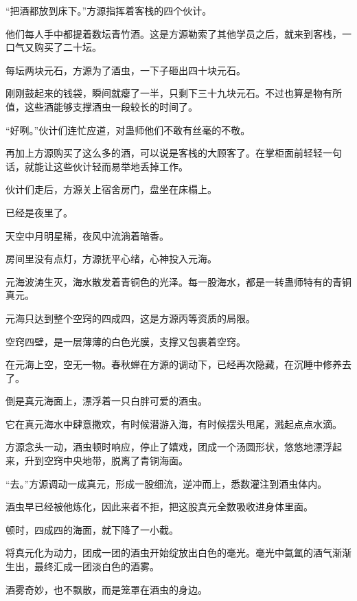 
\begin{this_body}



“把酒都放到床下。”方源指挥着客栈的四个伙计。

他们每人手中都提着数坛青竹酒。这是方源勒索了其他学员之后，就来到客栈，一口气又购买了二十坛。

每坛两块元石，方源为了酒虫，一下子砸出四十块元石。

刚刚鼓起来的钱袋，瞬间就瘪了一半，只剩下三十九块元石。不过也算是物有所值，这些酒能够支撑酒虫一段较长的时间了。

“好咧。”伙计们连忙应道，对蛊师他们不敢有丝毫的不敬。

再加上方源购买了这么多的酒，可以说是客栈的大顾客了。在掌柜面前轻轻一句话，就能让这些伙计轻而易举地丢掉工作。

伙计们走后，方源关上宿舍房门，盘坐在床榻上。

已经是夜里了。

天空中月明星稀，夜风中流淌着暗香。

房间里没有点灯，方源抚平心绪，心神投入元海。

元海波涛生灭，海水散发着青铜色的光泽。每一股海水，都是一转蛊师特有的青铜真元。

元海只达到整个空窍的四成四，这是方源丙等资质的局限。

空窍四壁，是一层薄薄的白色光膜，支撑又包裹着空窍。

在元海上空，空无一物。春秋蝉在方源的调动下，已经再次隐藏，在沉睡中修养去了。

倒是真元海面上，漂浮着一只白胖可爱的酒虫。

它在真元海水中肆意撒欢，有时候潜游入海，有时候摆头甩尾，溅起点点水滴。

方源念头一动，酒虫顿时响应，停止了嬉戏，团成一个汤圆形状，悠悠地漂浮起来，升到空窍中央地带，脱离了青铜海面。

“去。”方源调动一成真元，形成一股细流，逆冲而上，悉数灌注到酒虫体内。

酒虫早已经被他炼化，因此来者不拒，把这股真元全数吸收进身体里面。

顿时，四成四的海面，就下降了一小截。

将真元化为动力，团成一团的酒虫开始绽放出白色的毫光。毫光中氤氲的酒气渐渐生出，最终汇成一团淡白色的酒雾。

酒雾奇妙，也不飘散，而是笼罩在酒虫的身边。


\end{this_body}

